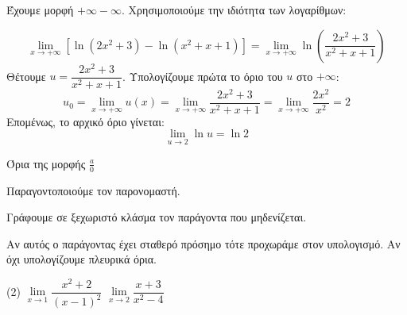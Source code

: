 \lysh
Έχουμε μορφή $+\infty - \infty$. Χρησιμοποιούμε την ιδιότητα των λογαρίθμων:

\[
\lim\limits_{x\to +\infty} \left[ \ln(2x^2+3) - \ln(x^2+x+1) \right] = \lim\limits_{x\to+\infty}\ln \left( \dfrac{2x^2+3}{x^2+x+1} \right)
\]
Θέτουμε $u = \dfrac{2x^2+3}{x^2+x+1}$. Υπολογίζουμε πρώτα το όριο του $u$ στο $+\infty$:
\[
u_0=\lim\limits_{x\to +\infty} u(x) = \lim\limits_{x\to +\infty} \dfrac{2x^2+3}{x^2+x+1} = \lim\limits_{x\to +\infty} \dfrac{2x^2}{x^2} = 2
\]
Επομένως, το αρχικό όριο γίνεται:
\[
\lim\limits_{u\to 2} \ln u = \ln 2
\]
\begin{askhsh}{Όρια της μορφής $ \frac{a}{0} $}
\bhmata\begin{bhma}
\item Παραγοντοποιούμε τον παρονομαστή.
\item Γράφουμε σε ξεχωριστό κλάσμα τον παράγοντα που μηδενίζεται.
\item Αν αυτός ο παράγοντας έχει σταθερό πρόσημο τότε προχωράμε στον υπολογισμό. Αν όχι υπολογίζουμε πλευρικά όρια.
\end{bhma}
\end{askhsh}
\begin{tasks}[label=\let\textdexiakeraia\relax\alph*.](2)
\task $\displaystyle \lim\limits_{x\to 1} \dfrac{x^2+2}{(x-1)^2}$
\task $\displaystyle \lim\limits_{x\to 2} \dfrac{x+3}{x^2-4}$
\end{tasks}
\lysh\vspace{-7mm}
